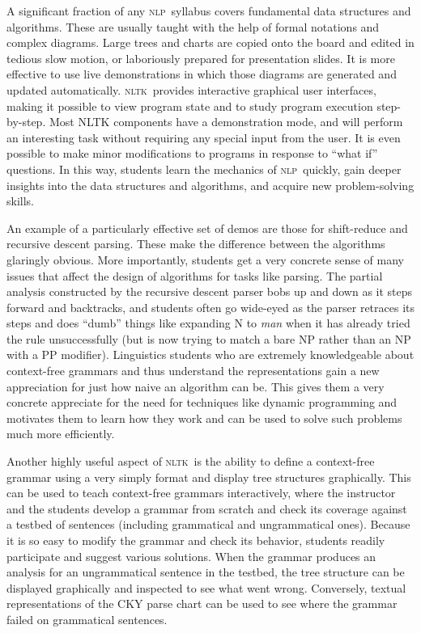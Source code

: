 \documentclass[11pt]{article}
\newcommand{\NLP}{\textsc{nlp}}
\newcommand{\NLTK}{\textsc{nltk}}
\begin{document}
A significant fraction of any \NLP\ syllabus covers fundamental data
structures and algorithms. These are usually taught with the help of
formal notations and complex diagrams. Large trees and charts are
copied onto the board and edited in tedious slow motion, or
laboriously prepared for presentation slides. It is more effective to
use live demonstrations in which those diagrams are generated and
updated automatically. \NLTK\ provides interactive graphical user
interfaces, making it possible to view program state and to study
program execution step-by-step. Most NLTK components have a
demonstration mode, and will perform an interesting task without
requiring any special input from the user. It is even possible to make
minor modifications to programs in response to ``what if'' questions. In
this way, students learn the mechanics of \NLP\ quickly, gain deeper
insights into the data structures and algorithms, and acquire new
problem-solving skills.

An example of a particularly effective set of demos are those for
shift-reduce and recursive descent parsing. These make the difference
between the algorithms glaringly obvious. More importantly, students
get a very concrete sense of many issues that affect the design of
algorithms for tasks like parsing. The partial analysis constructed by
the recursive descent parser bobs up and down as it steps forward and
backtracks, and students often go wide-eyed as the parser retraces its
steps and does ``dumb'' things like expanding N to {\it man} when it
has already tried the rule unsuccessfully (but is now trying to match
a bare NP rather than an NP with a PP modifier). Linguistics students
who are extremely knowledgeable about context-free grammars and thus
understand the representations gain a new appreciation for just how
naive an algorithm can be. This gives them a very concrete appreciate
for the need for techniques like dynamic programming and motivates
them to learn how they work and can be used to solve such problems
much more efficiently.

Another highly useful aspect of \NLTK\ is the ability to define a
context-free grammar using a very simply format and display tree
structures graphically. This can be used to teach context-free
grammars interactively, where the instructor and the students develop
a grammar from scratch and check its coverage against a testbed of
sentences (including grammatical and ungrammatical ones). Because it
is so easy to modify the grammar and check its behavior, students
readily participate and suggest various solutions. When the grammar
produces an analysis for an ungrammatical sentence in the testbed, the
tree structure can be displayed graphically and inspected to see what
went wrong. Conversely, textual representations of the CKY parse chart
can be used to see where the grammar failed on grammatical sentences.
\end{document}
